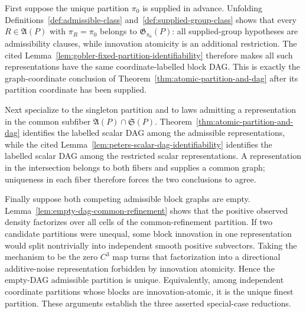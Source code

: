 First suppose the unique partition \(\pi_0\) is supplied in advance. Unfolding Definitions~\ref{def:admissible-class} and~\ref{def:supplied-group-class} shows that every \(R\in\mathfrak A(P)\) with \(\pi_R=\pi_0\) belongs to \(\mathfrak G_{\pi_0}(P)\): all supplied-group hypotheses are admissibility clauses, while innovation atomicity is an additional restriction. The cited Lemma~\ref{lem:gobler-fixed-partition-identifiability} therefore makes all such representations have the same coordinate-labelled block DAG. This is exactly the graph-coordinate conclusion of Theorem~\ref{thm:atomic-partition-and-dag} after its partition coordinate has been supplied.

Next specialize to the singleton partition and to laws admitting a representation in the common subfiber \(\mathfrak A(P)\cap\mathfrak S(P)\). Theorem~\ref{thm:atomic-partition-and-dag} identifies the labelled scalar DAG among the admissible representations, while the cited Lemma~\ref{lem:peters-scalar-dag-identifiability} identifies the labelled scalar DAG among the restricted scalar representations. A representation in the intersection belongs to both fibers and supplies a common graph; uniqueness in each fiber therefore forces the two conclusions to agree.

Finally suppose both competing admissible block graphs are empty. Lemma~\ref{lem:empty-dag-common-refinement} shows that the positive observed density factorizes over all cells of the common-refinement partition. If two candidate partitions were unequal, some block innovation in one representation would split nontrivially into independent smooth positive subvectors. Taking the mechanism to be the zero \(C^3\) map turns that factorization into a directional additive-noise representation forbidden by innovation atomicity. Hence the empty-DAG admissible partition is unique. Equivalently, among independent coordinate partitions whose blocks are innovation-atomic, it is the unique finest partition. These arguments establish the three asserted special-case reductions.